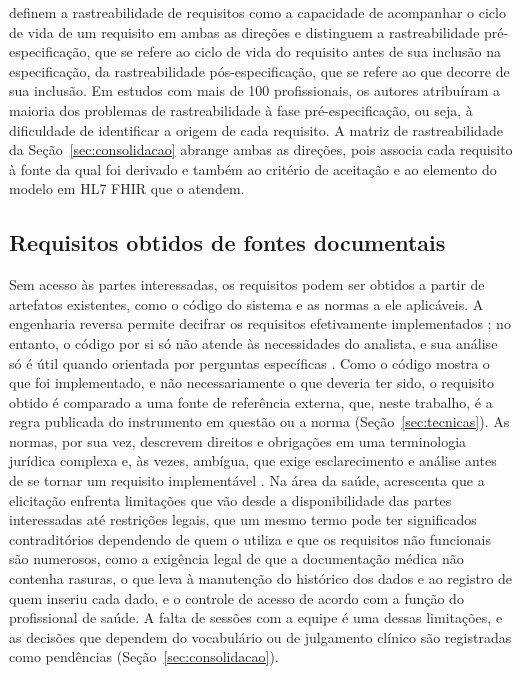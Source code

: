  definem a rastreabilidade de requisitos como a capacidade de acompanhar o
ciclo de vida de um requisito em ambas as direções e distinguem a rastreabilidade pré-especificação, que se refere ao
ciclo de vida do requisito antes de sua inclusão na especificação, da rastreabilidade pós-especificação, que se
refere ao que decorre de sua inclusão. Em estudos com mais de 100 profissionais, os autores atribuíram a maioria dos
problemas de rastreabilidade à fase pré-especificação, ou seja, à dificuldade de identificar a origem de cada
requisito. A matriz de rastreabilidade da Seção~\ref{sec:consolidacao} abrange ambas as direções, pois associa cada
requisito à fonte da qual foi derivado e também ao critério de aceitação e ao elemento do modelo em HL7 FHIR que o
atendem.

\subsection{Requisitos obtidos de fontes documentais}
\label{sec:ref-req-fontes}

Sem acesso às partes interessadas, os requisitos podem ser obtidos a partir de artefatos existentes, como o código do
sistema e as normas a ele aplicáveis. A engenharia reversa permite decifrar os requisitos efetivamente implementados
\cite[p.~15]{chikofsky1990reverse}; no entanto, o código por si só não atende às necessidades do analista, e sua
análise só é útil quando orientada por perguntas específicas \cite[p.~241]{sneed1996extracting}. Como o código mostra
o que foi implementado, e não necessariamente o que deveria ter sido, o requisito obtido é comparado a uma fonte de
referência externa, que, neste trabalho, é a regra publicada do instrumento em questão ou a norma
(Seção~\ref{sec:tecnicas}). As normas, por sua vez, descrevem direitos e obrigações em uma terminologia jurídica
complexa e, às vezes, ambígua, que exige esclarecimento e análise antes de se tornar um requisito implementável
\cite[p.~5]{breaux2008analyzing}. Na área da saúde,  acrescenta que a
elicitação enfrenta limitações que vão desde a disponibilidade das partes interessadas até restrições legais, que um
mesmo termo pode ter significados contraditórios dependendo de quem o utiliza e que os requisitos não funcionais são
numerosos, como a exigência legal de que a documentação médica não contenha rasuras, o que leva à manutenção do
histórico dos dados e ao registro de quem inseriu cada dado, e o controle de acesso de acordo com a função do
profissional de saúde. A falta de sessões com a equipe é uma dessas limitações, e as decisões que dependem do
vocabulário ou de julgamento clínico são registradas como pendências (Seção~\ref{sec:consolidacao}).


